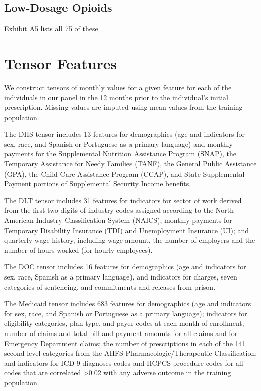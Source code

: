 \documentclass[11pt, letter]{article}
\begin{document}
\subsection{Low-Dosage Opioids}

Exhibit A5 lists all 75 of these 


\section{Tensor Features}

We construct tensors of monthly values for a given feature for each of the individuals in our panel in the 12 months prior to the individual's initial prescription. Missing values are imputed using mean values from the training population.

The DHS tensor includes 13 features for demographics (age and indicators for sex, race, and Spanish or Portuguese as a primary language) and monthly payments for the Supplemental Nutrition Assistance Program (SNAP), the Temporary Assistance for Needy Families (TANF), the General Public Assistance (GPA), the Child Care Assistance Program (CCAP), and State Supplemental Payment portions of Supplemental Security Income benefits.

The DLT tensor includes 31 features for indicators for sector of work derived from the first two digits of industry codes assigned according to the North American Industry Classification System (NAICS); monthly payments for Temporary Disability Insurance (TDI) and Unemployment Insurance (UI); and quarterly wage history, including wage amount, the number of employers and the number of hours worked (for hourly employees).

The DOC tensor includes 16 features for demographics (age and indicators for sex, race, Spanish as a primary language), and indicators for charges, seven categories of sentencing, and commitments and releases from prison.

The Medicaid tensor includes 683 features for demographics (age and indicators for sex, race, and Spanish or Portuguese as a primary language); indicators for eligibility categories, plan type, and payer codes at each month of enrollment; number of claims and total bill and payment amounts for all claims and for Emergency Department claims; the number of prescriptions in each of the 141 second-level categories from the AHFS Pharmacologic/Therapeutic Classification; and indicators for ICD-9 diagnoses codes and HCPCS procedure codes for all codes that are correlated >0.02 with any adverse outcome in the training population.
\end{document}
